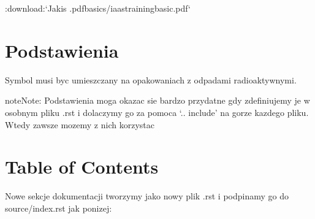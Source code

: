 \documentclass[letterpaper,10pt,english]{sphinxmanual}
\begin{document}

\begin{sphinxVerbatim}[commandchars=\\\{\}]
:download:{}`Jakis .pdf\PYGZlt{}basics/iaas\PYGZhy{}training\PYGZhy{}basic.pdf\PYGZgt{}{}`
\end{sphinxVerbatim}



\section{Podstawienia}
\label{\detokenize{tutorial:podstawienia}}
\begin{sphinxVerbatim}[commandchars=\\\{\}]
   
         
\end{sphinxVerbatim}

Symbol  musi byc umieszczany na opakowaniach z odpadami radioaktywnymi.

\begin{sphinxadmonition}{note}{Note:}
Podstawienia moga okazac sie bardzo przydatne gdy zdefiniujemy je w osobnym pliku .rst i dolaczymy go
za pomoca ‘.. include’ na gorze kazdego pliku. Wtedy zawsze mozemy z nich korzystac
\end{sphinxadmonition}

\begin{sphinxVerbatim}[commandchars=\\\{\}]
  
        
\end{sphinxVerbatim}


\section{Table of Contents}
\label{\detokenize{tutorial:table-of-contents}}
Nowe sekcje dokumentacji tworzymy jako nowy plik .rst i podpinamy go do source/index.rst jak ponizej:
\end{document}
